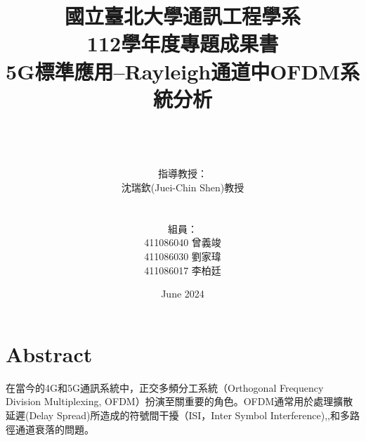 \documentclass[12pt,a4paper]{article} %
\begin{document}
 

\title{\centering\huge{國立臺北大學通訊工程學系\\112學年度專題成果書\\\vspace{2cm}
5G標準應用--Rayleigh通道中OFDM系統分析}} %

\author{\\\\\\指導教授：\\ 沈瑞欽(Juei-Chin Shen)教授\\\\\\組員：\\ 411086040 曾義竣\\411086030 劉家瑋\\411086017 李柏廷} %
\date{June 2024} %
\maketitle %
\thispagestyle{empty}
\setcounter{page}{0}
\newpage
\tableofcontents
\thispagestyle{empty}
\setcounter{page}{0}
\newpage
\section{Abstract}
在當今的4G和5G通訊系統中，正交多頻分工系統\cite{goldsmith2005wireless}（Orthogonal Frequency 
Division Multiplexing, OFDM）扮演至關重要的角色。OFDM通常用於處理擴散
延遲(Delay Spread)所造成的符號間干擾（ISI，Inter Symbol Interference)\cite{goldsmith2005wireless},\cite{ziemer2006principles},\cite{OFDM正交分頻多工系統1}和多路徑通道衰落的問題。
\end{document}
